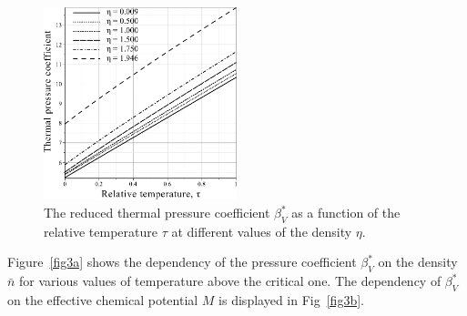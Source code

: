 \documentclass[12pt]{article}
\begin{document}
	\begin{figure}[h!]
		\centering \includegraphics[width=0.5\textwidth]{f3c.pdf}
		\vskip-3mm\caption{The reduced thermal pressure coefficient $\beta^*_V$ as a function of the relative temperature $\tau$ at different values of the density $\eta$. 
		}\label{fig3c}
	\end{figure}
	
	Figure~\ref{fig3a} shows the dependency of the pressure coefficient $\beta^*_V$ on the density $\bar{n}$ for various values of temperature above the critical one. The dependency of $\beta^*_V$ on the effective chemical potential $M$ is displayed in Fig~\ref{fig3b}.
	
\end{document}
